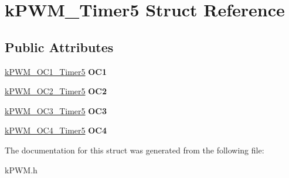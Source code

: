 \hypertarget{structkPWM__Timer5}{}\section{k\+P\+W\+M\+\_\+\+Timer5 Struct Reference}
\label{structkPWM__Timer5}
\subsection*{Public Attributes}
\begin{DoxyCompactItemize}
\item 
\hyperlink{structkPWM__OC1__Timer5}{k\+P\+W\+M\+\_\+\+O\+C1\+\_\+\+Timer5} {\bfseries O\+C1}\hypertarget{structkPWM__Timer5_a24b1b3cc22a65991e00eb067f307dddd}{}\label{structkPWM__Timer5_a24b1b3cc22a65991e00eb067f307dddd}

\item 
\hyperlink{structkPWM__OC2__Timer5}{k\+P\+W\+M\+\_\+\+O\+C2\+\_\+\+Timer5} {\bfseries O\+C2}\hypertarget{structkPWM__Timer5_a68786f901586a82fbe8d5316b834f397}{}\label{structkPWM__Timer5_a68786f901586a82fbe8d5316b834f397}

\item 
\hyperlink{structkPWM__OC3__Timer5}{k\+P\+W\+M\+\_\+\+O\+C3\+\_\+\+Timer5} {\bfseries O\+C3}\hypertarget{structkPWM__Timer5_a90c677409a408f98bba85592bbfb38fe}{}\label{structkPWM__Timer5_a90c677409a408f98bba85592bbfb38fe}

\item 
\hyperlink{structkPWM__OC4__Timer5}{k\+P\+W\+M\+\_\+\+O\+C4\+\_\+\+Timer5} {\bfseries O\+C4}\hypertarget{structkPWM__Timer5_a40ad871d2dad8083110273e14384f2be}{}\label{structkPWM__Timer5_a40ad871d2dad8083110273e14384f2be}

\end{DoxyCompactItemize}


The documentation for this struct was generated from the following file\+:\begin{DoxyCompactItemize}
\item 
k\+P\+W\+M.\+h\end{DoxyCompactItemize}

